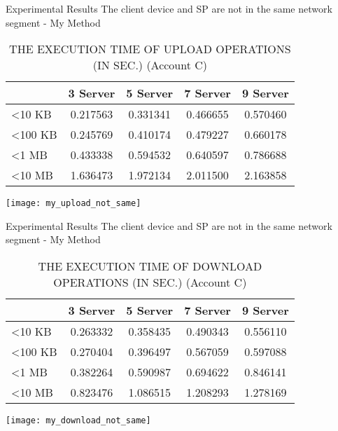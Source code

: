 \begin{frame}{Experimental Results}
{The client device and SP are \alert{not} in the same network segment - My Method}
	\scriptsize
    \begin{table}[]
    \centering
    \caption{THE EXECUTION TIME OF \alert{UPLOAD} OPERATIONS (IN SEC.) (Account C)}
    \begin{tabular}{lcccc}
                         & 3 Server & 5 Server & 7 Server & 9 Server \\ \hline
        \textless 10 KB  & 0.217563 & 0.331341 & 0.466655 & 0.570460 \\ \hline
        \textless 100 KB & 0.245769 & 0.410174 & 0.479227 & 0.660178 \\ \hline
        \textless 1 MB   & 0.433338 & 0.594532 & 0.640597 & 0.786688 \\ \hline
        \textless 10 MB  & 1.636473 & 1.972134 & 2.011500 & 2.163858 \\ \hline
    \end{tabular}
    \end{table}
    \begin{center}
		\texttt{[image: my\_upload\_not\_same]}
    \end{center}
\end{frame}

\begin{frame}{Experimental Results}
{The client device and SP are \alert{not} in the same network segment - My Method}
	\scriptsize
    \begin{table}[]
    \centering
    \caption{THE EXECUTION TIME OF \alert{DOWNLOAD} OPERATIONS (IN SEC.) (Account C)}
    \begin{tabular}{lcccc}
                         & 3 Server & 5 Server & 7 Server & 9 Server \\ \hline
        \textless 10 KB  & 0.263332 & 0.358435 & 0.490343 & 0.556110 \\ \hline
        \textless 100 KB & 0.270404 & 0.396497 & 0.567059 & 0.597088 \\ \hline
        \textless 1 MB   & 0.382264 & 0.590987 & 0.694622 & 0.846141 \\ \hline
        \textless 10 MB  & 0.823476 & 1.086515 & 1.208293 & 1.278169 \\ \hline
    \end{tabular}
    \end{table}
    \begin{center}
		\texttt{[image: my\_download\_not\_same]}
    \end{center}
\end{frame}

